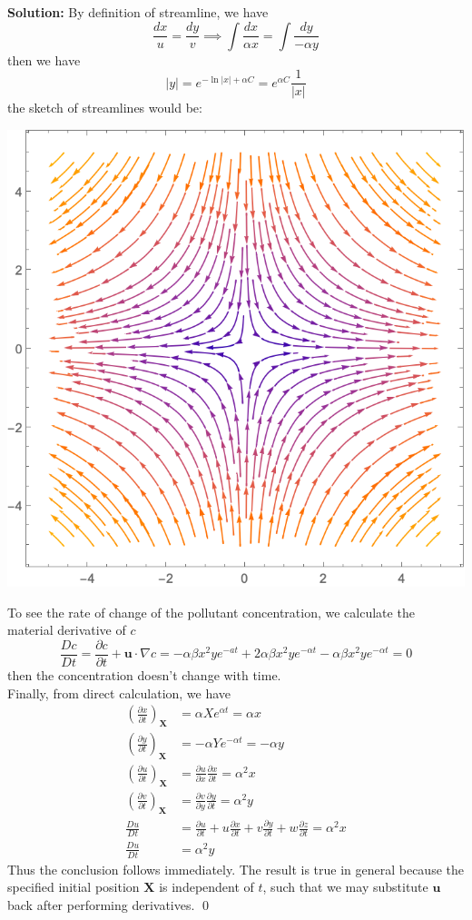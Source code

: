 \documentclass[12pt]{article}
\begin{document}
\textbf{Solution:} By definition of streamline, we have 
$$
    \frac{dx}{u}=\frac{dy}{v} \implies \int\frac{dx}{\alpha x}=\int\frac{dy}{-\alpha y}
$$ then we have 
$$
    |y|=e^{-\ln{|x|}+\alpha C}=e^{\alpha C}\frac{1}{|x|}
$$ the sketch of streamlines would be: \\
\begin{center}
    \includegraphics[scale=0.7]{images/streamline1.png}
\end{center}
\indent\indent To see the rate of change of the pollutant concentration, we calculate the material derivative of $c$
$$
    \frac{Dc}{Dt}=\frac{\partial c}{\partial t}+\textbf{u}\cdot\nabla c=-\alpha\beta x^2ye^{-at}+2\alpha\beta x^2ye^{-\alpha t}-\alpha\beta x^2ye^{-\alpha t} = 0
$$ then the concentration doesn't change with time. \\
\indent Finally, from direct calculation, we have
\begin{align*}
    \left(\frac{\partial x}{\partial t}\right)_{\textbf{X}}&=\alpha Xe^{\alpha t}=\alpha x \\
    \left(\frac{\partial y}{\partial t}\right)_{\textbf{X}}&=-\alpha Ye^{-\alpha t} = -\alpha y \\
    \left(\frac{\partial u}{\partial t}\right)_{\textbf{X}}&= \frac{\partial u}{\partial x}\frac{\partial x}{\partial t}=\alpha^2 x \\
    \left(\frac{\partial v}{\partial t}\right)_{\textbf{X}}&=\frac{\partial v}{\partial y}\frac{\partial y}{\partial t}=\alpha^2 y \\
    \frac{Du}{Dt}&=\frac{\partial u}{\partial t}+u\frac{\partial x}{\partial t} + v\frac{\partial y}{\partial t} + w\frac{\partial z}{\partial t}=\alpha^2 x \\
    \frac{Du}{Dt}&=\alpha^2 y
\end{align*} Thus the conclusion follows immediately. The result is true in general because the specified initial position $\textbf{X}$ is independent of $t$, such that we may substitute $\textbf{u}$ back after performing derivatives. \qed 
\end{document}
